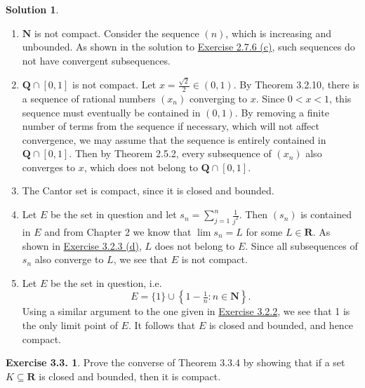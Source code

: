 \documentclass[12pt]{article}
\theoremstyle{definition}
\theoremstyle{exercise}
\newtheorem{exercise}{Exercise 3.3.}
\theoremstyle{solution}
\newtheorem*{solution}{Solution}
\newcommand{\N}{\mathbf{N}}
\newcommand{\Q}{\mathbf{Q}}
\newcommand{\R}{\mathbf{R}}
\begin{document}
\begin{solution}
    \begin{enumerate}
        \item \( \N \) is not compact. Consider the sequence \( (n) \), which is increasing and unbounded. As shown in the solution to \href{https://lew98.github.io/Mathematics/UA_Section_2_7_Exercises.pdf}{Exercise 2.7.6 (c)}, such sequences do not have convergent subsequences.

        \item \( \Q \cap [0, 1] \) is not compact. Let \( x = \tfrac{\sqrt{2}}{2} \in (0, 1) \). By Theorem 3.2.10, there is a sequence of rational numbers \( (x_n) \) converging to \( x \). Since \( 0 < x < 1 \), this sequence must eventually be contained in \( (0, 1) \). By removing a finite number of terms from the sequence if necessary, which will not affect convergence, we may assume that the sequence is entirely contained in \( \Q \cap [0, 1] \). Then by Theorem 2.5.2, every subsequence of \( (x_n) \) also converges to \( x \), which does not belong to \( \Q \cap [0, 1] \).

        \item The Cantor set is compact, since it is closed and bounded.

        \item Let \( E \) be the set in question and let \( s_n = \sum_{j=1}^n \tfrac{1}{j^2} \). Then \( (s_n) \) is contained in \( E \) and from Chapter 2 we know that \( \lim s_n = L \) for some \( L \in \R \). As shown in \href{https://lew98.github.io/Mathematics/UA_Section_3_2_Exercises.pdf}{Exercise 3.2.3 (d)}, \( L \) does not belong to \( E \). Since all subsequences of \( s_n \) also converge to \( L \), we see that \( E \) is not compact.

        \item Let \( E \) be the set in question, i.e.\
        \[
            E = \{ 1 \} \cup \left\{ 1 - \tfrac{1}{n} : n \in \N \right\}.
        \]
        Using a similar argument to the one given in \href{https://lew98.github.io/Mathematics/UA_Section_3_2_Exercises.pdf}{Exercise 3.2.2}, we see that 1 is the only limit point of \( E \). It follows that \( E \) is closed and bounded, and hence compact.
    \end{enumerate}
\end{solution}

\begin{exercise}
\label{ex:3}
    Prove the converse of Theorem 3.3.4 by showing that if a set \( K \subseteq \R \) is closed and bounded, then it is compact.
\end{exercise}
\end{document}

